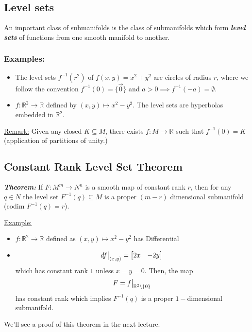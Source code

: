 \documentclass{article}
\newcommand{\R}{\mathbb{R}}
\newcommand{\restr}[2]{{%
  \left.\kern-\nulldelimiterspace %
  #1 %
  \vphantom{\big|} %
  \right|_{#2} %
  }}
\begin{document}
\vskip 1cm
\subsection{Level sets}

An important class of submanifolds is the class of submanifolds which form \emph{\textbf{level sets}} of functions from one smooth manifold to another.

\vskip 0.5cm
\subsubsection*{Examples:}
\begin{itemize}
  \item The level sets $f^{-1}(r^2)$ of $f(x,y) = x^2 + y^2$ are circles of radius $r$, where we follow the convention $f^{-1}(0) = \{\vec{0}\}$ and $a > 0 \implies f^{-1}(-a) = \emptyset$.
  \item $f : \R^2 \rightarrow \R$ defined by $(x,y) \mapsto x^2 - y^2$. The level sets are hyperbolas embedded in $\R^2$.
\end{itemize}

\vskip 0.5cm
\begin{dottedbox}
  \underline{Remark:} Given any closed $K \subseteq M$, there exists $f : M \rightarrow \R$ such that $f^{-1}(0) = K$ (application of partitions of unity.)
\end{dottedbox}

\vskip 1cm
\subsection{Constant Rank Level Set Theorem}

\begin{mathdefinitionbox}{}
  \emph{\textbf{Theorem:}} If $F : M^m \rightarrow N^n$ is a smooth map of constant rank $r$, then for any $q \in N$ the level set $F^{-1}(q) \subseteq M$ is a proper $(m - r)$ dimensional submanifold (codim $F^{-1}(q) = r$).
\end{mathdefinitionbox}

\vskip 0.5cm
\underline{Example:}

\begin{itemize}
  \item  $f : \R^2 \rightarrow \R$ defined as $(x, y) \mapsto x^2 - y^2$ has Differential
  \item \[ \restr{df}{(x,y)} = \begin{bmatrix}
    2x & -2y
  \end{bmatrix} \]
  which has constant rank $1$ unless $x = y = 0$. Then, the map 
  \[ F = \restr{f}{\R^2 \setminus \{0\}} \]
  has constant rank which implies $F^{-1}(q)$ is a proper $1-$dimensional submanifold.
\end{itemize}

We'll see a proof of this theorem in the next lecture.
\end{document}
